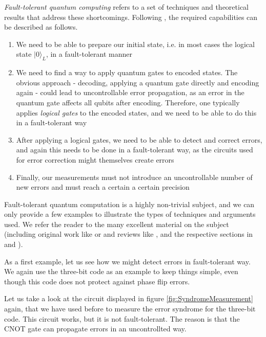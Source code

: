 \documentclass[a4paper, draft]{article}
\theoremstyle{own}
\theoremstyle{remark}
\begin{document}
\emph{Fault-tolerant quantum computing} refers to a set of techniques and theoretical results that address these shortcomings. Following \cite{Kempe}, the required capabilities can be described as follows.

\begin{enumerate}
	\item We need to be able to prepare our initial state, i.e. in most cases the logical state $|0 \rangle_L$, in a fault-tolerant manner
	\item We need to find a way to apply quantum gates to encoded states. The obvious approach - decoding, applying a quantum gate directly and encoding again - could lead to uncontrollable error propagation, as an error in the quantum gate affects all qubits after encoding. Therefore, one typically applies \emph{logical gates} to the encoded states, and we need to be able to do this in a fault-tolerant way
	\item After applying a logical gates, we need to be able to detect and correct errors, and again this needs to be done in a fault-tolerant way, as the circuits used for error correction might themselves create errors
	\item Finally, our measurements must not introduce an uncontrollable number of new errors and must reach a certain a certain precision
\end{enumerate}

Fault-tolerant quantum computation is a highly non-trivial subject, and we can only provide a few examples to illustrate the types of techniques and arguments used. We refer the reader to the many excellent material on the subject (including original work like \cite{Shor96} or \cite{GThesis} and reviews like \cite{Kempe}, \cite{Beginners} and the respective sections in \cite{RieffelPolak} and \cite{NC}).

As a first example, let us see how we might detect errors in fault-tolerant way. We again use the three-bit code as an example to keep things simple, even though this code does not protect against phase flip errors.

Let us take a look at the circuit displayed in figure \ref{fig:SyndromeMeasurement} again, that we have used before to measure the error syndrome for the three-bit code. This circuit works, but it is not fault-tolerant. The reason is that the CNOT gate can propagate errors in an uncontrollted way.
\end{document}
